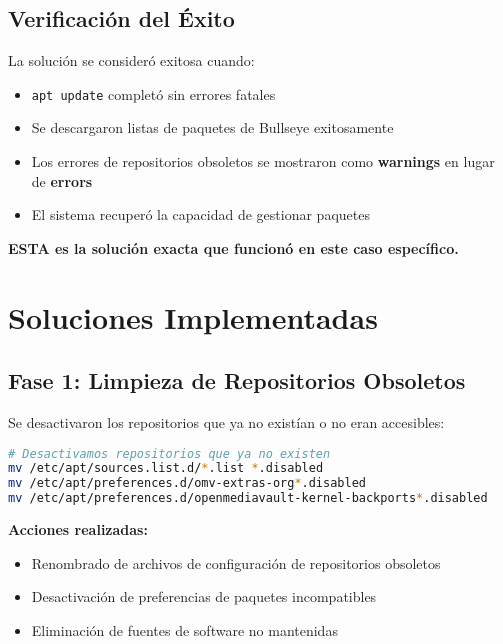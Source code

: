 \documentclass[12pt, a4paper]{article}
\begin{document}
\subsection{Verificación del Éxito}
\label{subsec:verificacion_exito}

La solución se consideró exitosa cuando:

\begin{itemize}
    \item \texttt{apt update} completó sin errores fatales
    \item Se descargaron listas de paquetes de Bullseye exitosamente
    \item Los errores de repositorios obsoletos se mostraron como \textbf{warnings} en lugar de \textbf{errors}
    \item El sistema recuperó la capacidad de gestionar paquetes
\end{itemize}

\textbf{ESTA es la solución exacta que funcionó en este caso específico.}

\clearpage

\section{Soluciones Implementadas}
\label{sec:soluciones}

\subsection{Fase 1: Limpieza de Repositorios Obsoletos}
\label{subsec:limpieza_repositorios}

Se desactivaron los repositorios que ya no existían o no eran accesibles:

\begin{lstlisting}[language=bash, caption=Limpieza de repositorios obsoletos]
# Desactivamos repositorios que ya no existen
mv /etc/apt/sources.list.d/*.list *.disabled
mv /etc/apt/preferences.d/omv-extras-org*.disabled
mv /etc/apt/preferences.d/openmediavault-kernel-backports*.disabled
\end{lstlisting}

\textbf{Acciones realizadas:}
\begin{itemize}
    \item Renombrado de archivos de configuración de repositorios obsoletos
    \item Desactivación de preferencias de paquetes incompatibles
    \item Eliminación de fuentes de software no mantenidas
\end{itemize}
\end{document}
